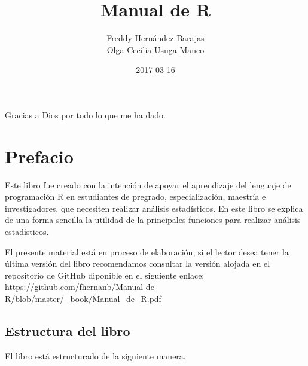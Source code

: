 \documentclass[10pt,]{krantz}
\title{Manual de R}
\author{Freddy Hernández Barajas\\
Olga Cecilia Usuga Manco}
\date{2017-03-16}
\let\proglang=\textsf
\begin{document}
\maketitle


\thispagestyle{empty}

\begin{center}

Gracias a Dios por todo lo que me ha dado.

\end{center}

\setlength{\abovedisplayskip}{-5pt}
\setlength{\abovedisplayshortskip}{-5pt}

{
\hypersetup{linkcolor=black}
\setcounter{tocdepth}{2}
\tableofcontents
}
\listoftables
\listoffigures
\chapter*{Prefacio}\label{prefacio}


Este libro fue creado con la intención de apoyar el aprendizaje del
lenguaje de programación \proglang{R} en estudiantes de pregrado,
especialización, maestría e investigadores, que necesiten realizar
análisis estadísticos. En este libro se explica de una forma sencilla la
utilidad de la principales funciones para realizar análisis
estadísticos.

El presente material está en proceso de elaboración, si el lector desea
tener la última versión del libro recomendamos consultar la versión
alojada en el repositorio de GitHub diponible en el siguiente enlace:
\url{https://github.com/fhernanb/Manual-de-R/blob/master/_book/Manual_de_R.pdf}

\section*{Estructura del libro}\label{estructura-del-libro}


El libro está estructurado de la siguiente manera.
\end{document}
